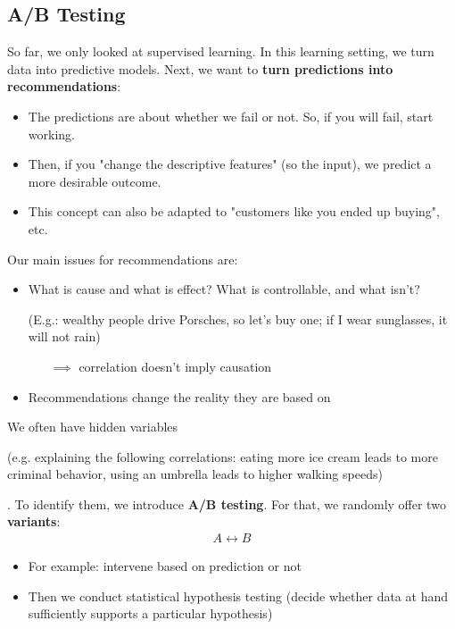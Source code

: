 \subsection{A/B Testing}

So far, we only looked at supervised learning. In this learning setting, we turn data into predictive models. Next, we want to \textbf{turn predictions into recommendations}:
\begin{itemize}
  \item The predictions are about whether we fail or not. So, if you will fail, start working.
  \item Then, if you "change the descriptive features" (so the input), we predict a more desirable outcome.
  \item This concept can also be adapted to "customers like you ended up buying", etc.
\end{itemize}

Our main issues for recommendations are:
\begin{itemize}
  \item What is cause and what is effect? What is controllable, and what isn't? 
    \begin{note}(E.g.: wealthy people drive Porsches, so let's buy one; if I wear sunglasses, it will not rain)\end{note}
    \begin{itemize}
      \item[$\implies$] correlation doesn't imply causation
    \end{itemize}
  \item Recommendations change the reality they are based on
\end{itemize}

We often have hidden variables \begin{note}(e.g. explaining the following correlations: eating more ice cream leads to more criminal behavior, using an umbrella leads to higher walking speeds)\end{note}. To identify them, we introduce \textbf{A/B testing}. For that, we randomly offer two \textbf{variants}: 
\begin{align*}
  A \longleftrightarrow B
\end{align*}
\begin{itemize}
  \item For example: intervene based on prediction or not
  \item Then we conduct statistical hypothesis testing (decide whether data at hand sufficiently supports a particular hypothesis)
\end{itemize}
